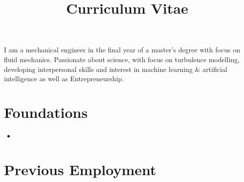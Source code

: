 \documentclass[11pt,a4paper,sans]{moderncv}        %
\title{Curriculum Vitae}                               %
\begin{document}
\makecvtitle


\small{I am a mechanical engineer in the final year of a master's degree with focus on fluid mechanics. Passionate about science, with focus on turbulence modelling, developing interpersonal skills and interest in machine learning \& artificial intelligence as well as Entrepreneurship.}

\section{Foundations}

\vspace{6pt}

\begin{itemize}
	
\item{}

\end{itemize}

\section{Previous Employment}

\vspace{6pt}
\end{document}
